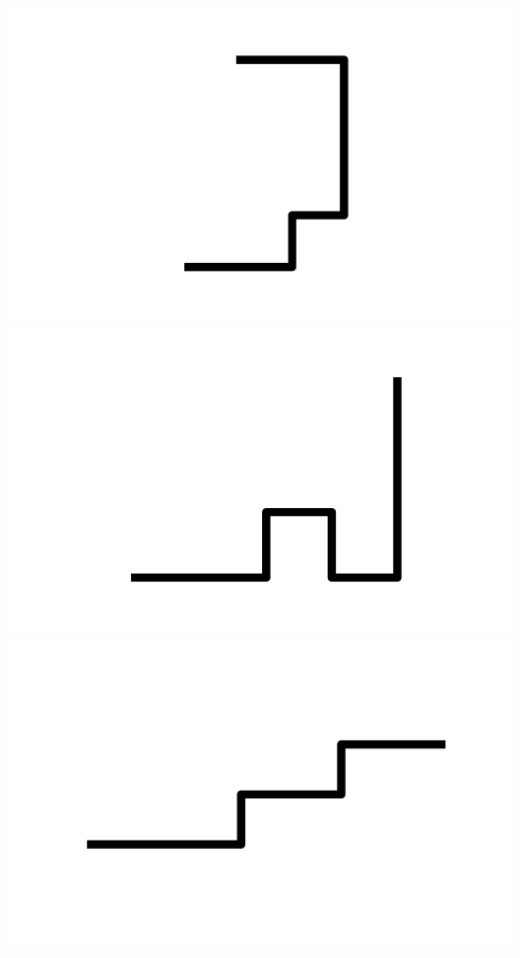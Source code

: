 \documentclass[]{report}
\begin{document}
\includegraphics[scale=.1]{pictures/21/state_cluster_shapes_7.pdf} 
\includegraphics[scale=.1]{pictures/21/state_cluster_shapes_8.pdf} 
\includegraphics[scale=.1]{pictures/21/state_cluster_shapes_9.pdf} 
\end{document}
